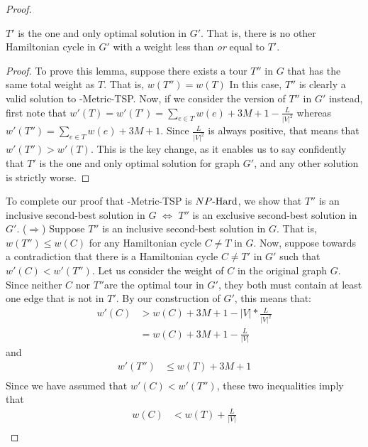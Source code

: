 \begin{proof}
    \begin{lemma*}
        $T'$ is the one and only optimal solution in $G'$. That is, there is no other Hamiltonian cycle in $G'$ with a weight less than \textit{or} equal to $T'$.
    \end{lemma*}

\begin{proof}
        To prove this lemma, suppose there exists a tour $T''$ in $G$ that has the same total weight as $T$. That is, $w(T'') = w(T)$ In this case, $T''$ is clearly a valid solution to \inob{}-Metric-TSP. Now, if we consider the version of $T''$ in $G'$ instead, first note that $w'(T) = w'(T') = \sum_{e\in T} w(e) + 3M + 1 - \frac{L}{|V|^2}$ whereas $w'(T'') = \sum_{e\in T} w(e) + 3M + 1 $. Since $\frac{L}{|V|^2}$ is always positive, that means that $w'(T'') > w'(T)$. This is the key change, as it enables us to say confidently that $T'$ is the one and only optimal solution for graph $G'$, and any other solution is strictly worse.
\end{proof}
    To complete our proof that \exob{}-Metric-TSP is ${NP\text{-Hard{}}}$, we show that $T''$ is an inclusive second-best solution in $G$ $\iff$ $T''$ is an exclusive second-best solution in $G'$.
    ($\Rightarrow$) Suppose $T''$ is an inclusive second-best solution in $G$. That is, $w(T'') \leq w(C)$ for any Hamiltonian cycle $C \neq T$ in $G$. Now, suppose towards a contradiction that there is a Hamiltonian cycle $C \neq T'$ in $G'$ such that $w'(C) < w'(T'')$. 
    Let us consider the weight of $C$ in the original graph $G$. Since neither $C$ nor $T'' $are the optimal tour in $G'$, they both must contain at least one edge that is not in $T'$. By our construction of $G'$, this means that:
\begin{equation*}
\begin{split}
w'(C) &> w(C) + 3M + 1 - |V|*\frac{L}{|V|^2}\\
 &= w(C) + 3M + 1 - \frac{L}{|V|}
\end{split}
\end{equation*}
and
\begin{equation*}
\begin{split}
w'(T'') &\leq w(T) + 3M + 1\\
\end{split}
\end{equation*}
Since we have assumed that $w'(C) < w'(T'')$, these two inequalities imply that 
\begin{equation*}
\begin{split}
w(C)  &< w(T) + \frac{L}{|V|}\\

\end{split}
\end{equation*}
\end{proof}
